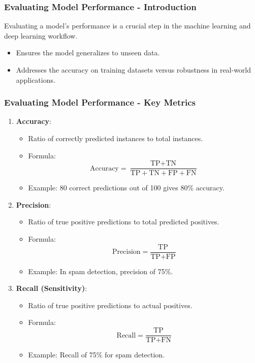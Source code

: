 \documentclass[aspectratio=169]{beamer}
\begin{document}
\begin{frame}[fragile]
    \frametitle{Evaluating Model Performance - Introduction}
    Evaluating a model's performance is a crucial step in the machine learning and deep learning workflow. 
    \begin{itemize}
        \item Ensures the model generalizes to unseen data.
        \item Addresses the accuracy on training datasets versus robustness in real-world applications.
    \end{itemize}
\end{frame}

\begin{frame}[fragile]
    \frametitle{Evaluating Model Performance - Key Metrics}
    \begin{enumerate}
        \item \textbf{Accuracy}:
        \begin{itemize}
            \item Ratio of correctly predicted instances to total instances.
            \item Formula: 
              \[
              \text{Accuracy} = \frac{\text{TP} + \text{TN}}{\text{TP} + \text{TN} + \text{FP} + \text{FN}}
              \]
            \item Example: 80 correct predictions out of 100 gives 80\% accuracy.
        \end{itemize}

        \item \textbf{Precision}:
        \begin{itemize}
            \item Ratio of true positive predictions to total predicted positives.
            \item Formula:
              \[
              \text{Precision} = \frac{\text{TP}}{\text{TP} + \text{FP}}
              \]
            \item Example: In spam detection, precision of 75\%.
        \end{itemize}

        \item \textbf{Recall (Sensitivity)}:
        \begin{itemize}
            \item Ratio of true positive predictions to actual positives.
            \item Formula:
              \[
              \text{Recall} = \frac{\text{TP}}{\text{TP} + \text{FN}}
              \]
            \item Example: Recall of 75\% for spam detection.
        \end{itemize}
    \end{enumerate}
\end{frame}
\end{document}

